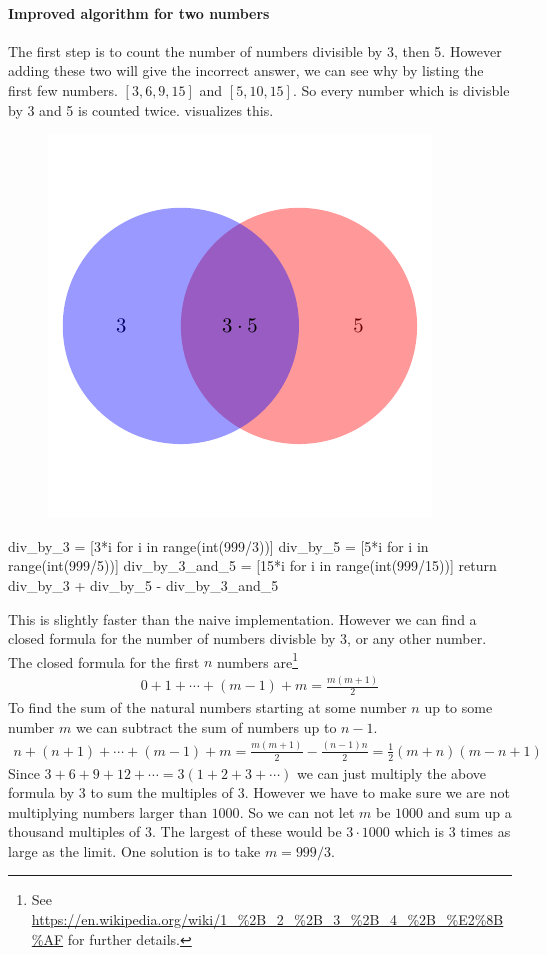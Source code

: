 \paragraph*{Improved algorithm for two numbers}
%
The first step is to count the number of numbers divisible by 3, then 5. 
However adding these two will give the incorrect answer, we can see why by listing the first few numbers.
$[3, 6, 9, 15]$ and $[5, 10, 15]$. So every number which is divisble by 3 and 5 is counted twice.  visualizes this.
%
\begin{figure}[h!tbp]
	\includegraphics[scale=1, trim={0.25cm 1.25cm 0.25cm 1.25cm}, clip]{Images/Project-Euler-001-Venn-Diagram-2.pdf}
	\caption{}
	\label{fig:PE1-venn-2}
\end{figure}
% 
\begin{pythoncode}
    div_by_3 = [3*i for i in range(int(999/3))]
    div_by_5 = [5*i for i in range(int(999/5))]
    div_by_3_and_5 = [15*i for i in range(int(999/15))]
    return div_by_3 + div_by_5 - div_by_3_and_5
\end{pythoncode}
%
This is slightly faster than the naive implementation. However we can find a closed formula for the number of numbers
divisble by 3, or any other number. The closed formula for the first $n$ numbers are\footnote{See \url{https://en.wikipedia.org/wiki/1_\%2B_2_\%2B_3_\%2B_4_\%2B_\%E2\%8B\%AF} for further details.}
%
\begin{align*}
	0 + 1 + \cdots + (m-1) + m = \frac{m(m+1)}{2}
\end{align*}
%
To find the sum of the natural numbers starting at some number $n$ up to some number $m$ we can subtract the sum of numbers up to $n-1$. 
%
\begin{align*}
	  n + (n+1) + \cdots +(m-1) + m
	= \frac{m(m+1)}{2} - \frac{(n-1)n}{2}
	= \frac{1}{2}(m+n)(m-n+1)
\end{align*} 
Since $3 + 6 + 9 + 12 + \cdots = 3 (1 + 2 + 3 + \cdots)$ we can just multiply the above formula by $3$ to sum the multiples of $3$. 
However we have to make sure we are not multiplying numbers larger than $1000$. So we can not let $m$ be $1000$ and sum up a thousand multiples of $3$.
The largest of these would be $3 \cdot 1000$ which is 3 times as large as the limit. One solution is to take $m = 999/3$. 


